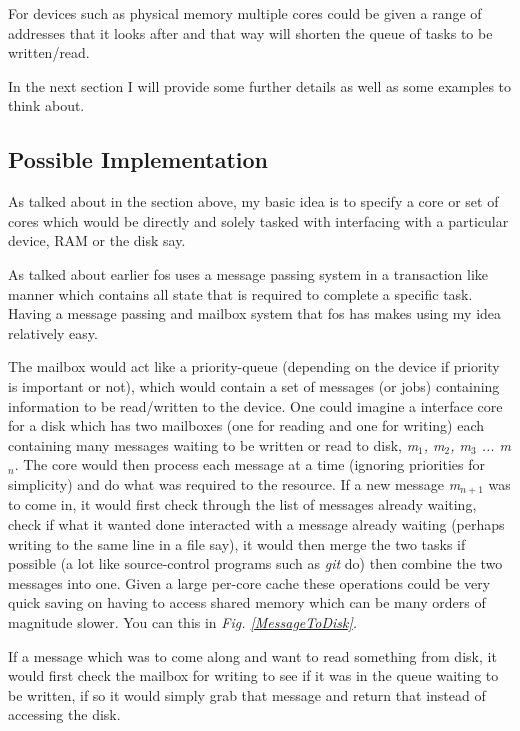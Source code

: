 \documentclass[journal]{IEEEtran}
\begin{document}
For devices such as physical memory multiple cores could be given a range of addresses that it looks after and that way will shorten the queue of tasks to be written/read.

In the next section I will provide some further details as well as some examples to think about.

\subsection{Possible Implementation}

As talked about in the section above, my basic idea is to specify a core or set of cores which would be directly and solely tasked with interfacing with a particular device, RAM or the disk say. 

As talked about earlier fos uses a message passing system in a transaction like manner which contains all state that is required to complete a specific task. Having a message passing and mailbox system that fos has makes using my idea relatively easy.

The mailbox would act like a priority-queue (depending on the device if priority is important or not), which would contain a set of messages (or jobs) containing information to be read/written to the device. One could imagine a interface core for a disk which has two mailboxes (one for reading and one for writing) each containing many messages waiting to be written or read to disk, \emph{m$_{1}$, m$_{2}$, m$_{3}$ ... m$_{n}$}. The core would then process each message at a time (ignoring priorities for simplicity) and do what was required to the resource. If a new message \emph{m$_{n+1}$} was to come in, it would first check through the list of messages already waiting, check if what it wanted done interacted with a message already waiting (perhaps writing to the same line in a file say), it would then merge the two tasks if possible (a lot like source-control programs such as \emph{git} do) then combine the two messages into one. Given a large per-core cache these operations could be very quick saving on having to access shared memory which can be many orders of magnitude slower. You can this in \emph{Fig. \ref{MessageToDisk}.}

If a message which was to come along and want to read something from disk, it would first check the mailbox for writing to see if it was in the queue waiting to be written, if so it would simply grab that message and return that instead of accessing the disk.
\end{document}
